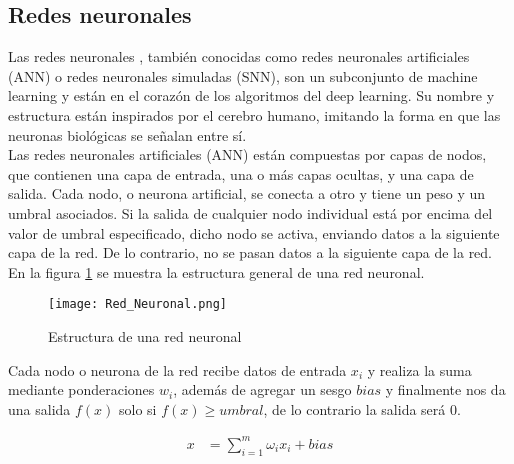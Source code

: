 \subsection{Redes neuronales}
Las redes neuronales \cite{RedesNeuronales}, también conocidas como redes neuronales artificiales (ANN) o redes neuronales simuladas (SNN),
son un subconjunto de machine learning y están en el corazón de los algoritmos del deep learning. Su nombre y estructura están
inspirados por el cerebro humano, imitando la forma en que las neuronas biológicas se señalan entre sí.\\
Las redes neuronales artificiales (ANN) están compuestas por capas de nodos, que contienen una capa de entrada, una o más
capas ocultas, y una capa de salida. Cada nodo, o neurona artificial, se conecta a otro y tiene un peso y un umbral asociados.
Si la salida de cualquier nodo individual está por encima del valor de umbral especificado, dicho nodo se activa, enviando datos
a la siguiente capa de la red. De lo contrario, no se pasan datos a la siguiente capa de la red. En la figura \ref{fig:SRCNN_RedNeuronal}
se muestra la estructura general de una red neuronal.

\begin{figure}[H]
    \centering
    \texttt{[image: Red\_Neuronal.png]}
    \caption{Estructura de una red neuronal}
    \label{fig:SRCNN_RedNeuronal}
\end{figure}

Cada nodo o neurona de la red recibe datos de entrada $x_i$ y realiza la suma mediante ponderaciones $w_i$, además de agregar un
sesgo $bias$ y finalmente nos da una salida $f(x)$ solo si $f(x)\geq umbral$, de lo contrario la salida será $0$.

\begin{align}
    \label{eqn:SRCNN_RedNeuronal}
                 x&=\sum_{i=1}^{m}\omega_ix_i+bias
\end{align}

